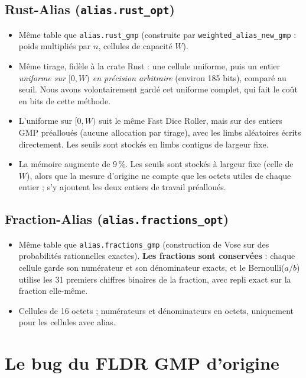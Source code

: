 \documentclass[11pt,a4paper]{article}
\newcommand{\code}[1]{\texttt{#1}}
\begin{document}
\subsection{Rust-Alias (\code{alias.rust\_opt})}
\begin{itemize}
\item Même table que \code{alias.rust\_gmp} (construite par \code{weighted\_alias\_new\_gmp} :
  poids multipliés par $n$, cellules de capacité $W$).
\item Même tirage, fidèle à la crate Rust : une cellule uniforme, puis un entier
  \emph{uniforme sur $[0, W)$ en précision arbitraire} (environ 185 bits), comparé au
  seuil. Nous avons volontairement gardé cet uniforme complet, qui fait le coût en bits
  de cette méthode.
\item L'uniforme sur $[0, W)$ suit le même Fast Dice Roller, mais sur des entiers GMP
  préalloués (aucune allocation par tirage), avec les limbs aléatoires écrits
  directement. Les seuils sont stockés en limbs contigus de largeur fixe.
\item La mémoire augmente de 9\,\%. Les seuils sont stockés à largeur fixe (celle de
  $W$), alors que la mesure d'origine ne compte que les octets utiles de chaque entier ;
  s'y ajoutent les deux entiers de travail préalloués.
\end{itemize}

\subsection{Fraction-Alias (\code{alias.fractions\_opt})}
\begin{itemize}
\item Même table que \code{alias.fractions\_gmp} (construction de Vose sur des
  probabilités rationnelles exactes). \textbf{Les fractions sont conservées} : chaque
  cellule garde son numérateur et son dénominateur exacts, et le Bernoulli($a/b$)
  utilise les 31 premiers chiffres binaires de la fraction, avec repli exact sur la
  fraction elle-même.
\item Cellules de 16 octets ; numérateurs et dénominateurs en octets, uniquement pour
  les cellules avec alias.
\end{itemize}

\section{Le bug du FLDR GMP d'origine}
\label{sec:fldr}
\end{document}

